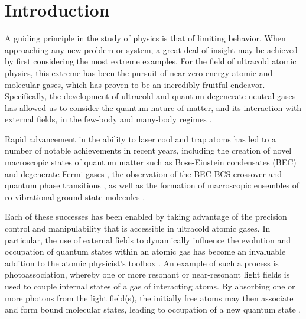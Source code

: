 \chapter{Introduction} \label{ch:intro}
A guiding principle in the study of physics is that of limiting behavior.
When approaching any new problem or system, a great deal of insight may be achieved by first considering the most extreme examples.
For the field of ultracold atomic physics, this extreme has been the pursuit of near zero-energy atomic and molecular gases, which has proven to be an incredibly fruitful endeavor.
Specifically, the development of ultracold and quantum degenerate neutral gases has allowed us to consider the quantum nature of matter, and its interaction with external fields, in the few-body and many-body regimes \cite{gps08,Kohler2006,wbz99,ccg11,swm10,bdz08,Chin2010,Bertelson2007,mmn11,bdz08}.

Rapid advancement in the ability to laser cool and trap atoms \cite{mvs99,mvs99,psm02} has led to a number of notable achievements in recent years, including the creation of novel macroscopic states of quantum matter such as Bose-Einstein condensates (BEC) and degenerate Fermi gases \cite{aem95,Bradley1995,dma95,DeMarco1999,zhg03,MartinezdeEscolar2010,Mickelson2010ja,dym10,stg10}, the observation of the BEC-BCS crossover and quantum phase transitions \cite{rgj04,zss04,cba04Science,Bourdel2004,grj03,gme02,jsg08,Snoke2002,zbb14}, as well as the formation of macroscopic ensembles of ro-vibrational ground state molecules \cite{rtb03,Jones2006, Reinaudi2012,Stellmer2012,nom08,Lang2008}.

Each of these successes has been enabled by taking advantage of the precision control and manipulability that is accessible in ultracold atomic gases.
In particular, the use of external fields to dynamically influence the evolution and occupation of quantum states within an atomic gas has become an invaluable addition to the atomic physicist's toolbox \cite{Chin2010}.
An example of such a process is photoassociation, whereby one or more resonant or near-resonant light fields is used to couple internal states of a gas of interacting atoms.
By absorbing one or more photons from the light field(s), the initially free atoms may then associate and form bound molecular states, leading to occupation of a new quantum state \cite{Kohler2006, Jones2006, Burnett2002}.

